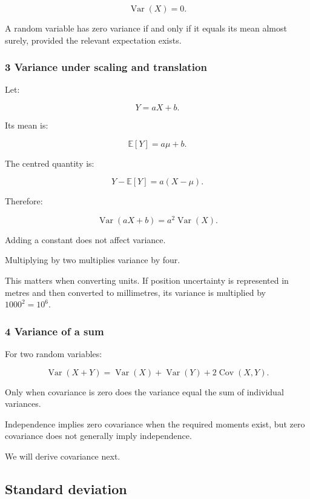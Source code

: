 \[
 \operatorname{Var}(X)=0.
\]

A random variable has zero variance if and only if it equals its mean almost surely, provided the relevant expectation exists.

\subsubsection{3 Variance under scaling and translation}\label{02-foundations-ii-ch023-variance-under-scaling-and-translation}

Let:

\[
 Y=aX+b.
\]

Its mean is:

\[
 \mathbb E[Y]=a\mu+b.
\]

The centred quantity is:

\[
 Y-\mathbb E[Y]=a(X-\mu).
\]

Therefore:

\[
 \boxed{ \operatorname{Var}(aX+b)=a^2\operatorname{Var}(X) }.
\]

Adding a constant does not affect variance.

Multiplying by two multiplies variance by four.

This matters when converting units. If position uncertainty is represented in metres and then converted to millimetres, its variance is multiplied by \(1000^2=10^6\).

\subsubsection{4 Variance of a sum}\label{02-foundations-ii-ch023-variance-of-a-sum}

For two random variables:

\[
 \operatorname{Var}(X+Y) = \operatorname{Var}(X)+ \operatorname{Var}(Y)+ 2\operatorname{Cov}(X,Y).
\]

Only when covariance is zero does the variance equal the sum of individual variances.

Independence implies zero covariance when the required moments exist, but zero covariance does not generally imply independence.

We will derive covariance next.

\subsection{Standard deviation}\label{02-foundations-ii-ch023-standard-deviation}

